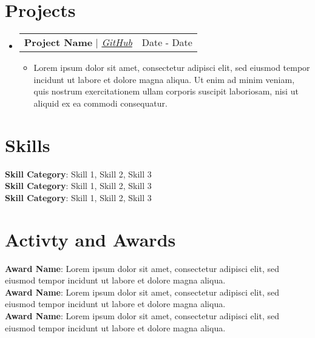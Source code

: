 \documentclass[letterpaper,12pt]{article}
\makeatletter
\newcommand{\resumeItem}[1]{
  \item\small{
    {#1 \vspace{-2pt}}
  }
}
\newcommand{\resumeProjectHeading}[2]{
    \item
    \begin{tabular*}{0.97\textwidth}{l@{\extracolsep{\fill}}r}
      \small#1 & #2 \\
    \end{tabular*}\vspace{-7pt}
}
\newcommand{\resumeSubHeadingListStart}{\begin{itemize}[leftmargin=0.15in, label={}]}
\newcommand{\resumeSubHeadingListEnd}{\end{itemize}}
\newcommand{\resumeItemListStart}{\begin{itemize}}
\newcommand{\resumeItemListEnd}{\end{itemize}\vspace{-5pt}}
\makeatother
\begin{document}
\section{Projects}
\resumeSubHeadingListStart

\resumeProjectHeading
{\textbf{Project Name} $|$ \href{https://github.com/}{\footnotesize\emph{GitHub \faIcon{external-link-alt}}}}{Date - Date}
\resumeItemListStart
\resumeItem{Lorem ipsum dolor sit amet, consectetur adipisci elit, sed eiusmod tempor incidunt ut labore et dolore magna aliqua. Ut enim ad minim veniam, quis nostrum exercitationem ullam corporis suscipit laboriosam, nisi ut aliquid ex ea commodi consequatur.}
\resumeItemListEnd

\resumeSubHeadingListEnd

\section{Skills}
\begin{itemize}[leftmargin=0.15in, label={}]
    \small{\item{

                    \textbf{Skill Category}{: Skill 1, Skill 2, Skill 3} \\

                    \textbf{Skill Category}{: Skill 1, Skill 2, Skill 3} \\

                    \textbf{Skill Category}{: Skill 1, Skill 2, Skill 3}


              }}
\end{itemize}


\section{Activty and Awards}

\begin{itemize}[leftmargin=0.15in, label={}]
    \small{\item{

                    \textbf{Award Name}{: Lorem ipsum dolor sit amet, consectetur adipisci elit, sed eiusmod tempor incidunt ut labore et dolore magna aliqua.} \\

                    \textbf{Award Name}{: Lorem ipsum dolor sit amet, consectetur adipisci elit, sed eiusmod tempor incidunt ut labore et dolore magna aliqua.} \\

                    \textbf{Award Name}{: Lorem ipsum dolor sit amet, consectetur adipisci elit, sed eiusmod tempor incidunt ut labore et dolore magna aliqua.}


              }}
\end{itemize}

\end{document}
